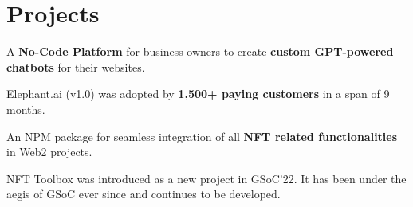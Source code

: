 \documentclass[]{deedy-resume-openfont}
\begin{document}
%
%

\section{Projects}

\begin{tightemize}
\item A \textbf{No-Code Platform} for business owners to create \textbf{custom GPT-powered chatbots} for their websites.
\item Elephant.ai (v1.0) was adopted by \textbf{1,500+ paying customers} in a span of 9 months.
\end{tightemize}
\sectionsep

\begin{tightemize}
\item An NPM package for seamless integration of all \textbf{NFT related functionalities} in Web2 projects.
\item NFT Toolbox was introduced as a new project in GSoC'22. It has been under the aegis of GSoC ever since and continues to be developed.
\end{tightemize}
\sectionsep

\end{document}
